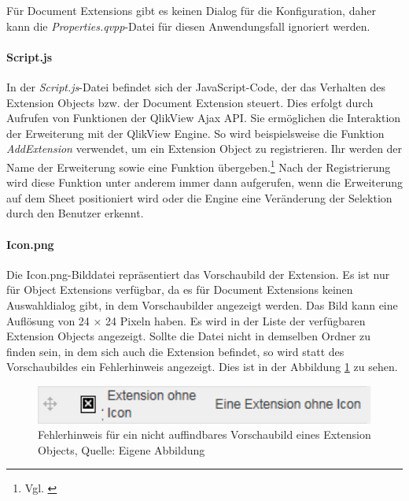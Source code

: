 Für Document Extensions gibt es keinen Dialog für die Konfiguration, daher kann die \textit{Properties.qvpp}-Datei für diesen Anwendungs\-fall ignoriert werden.

\paragraph{Script.js}

In der \textit{Script.js}-Datei befindet sich der JavaScript-Code, der das Verhalten des Extension Objects bzw. der Document Extension steuert. Dies erfolgt durch Aufrufen von Funktionen der QlikView Ajax API. Sie ermöglichen die Interaktion der Erweiterung mit der QlikView Engine. So wird beispielsweise die Funktion \textit{AddExtension} verwendet, um ein Extension Object zu registrieren. Ihr werden der Name der Erweiterung sowie eine Funktion übergeben.\footnote{Vgl. \cite{QlikViewAjaxJavaScriptLibraryAddExtension}} Nach der Registrierung wird diese Funktion unter anderem immer dann aufgerufen, wenn die Erweiterung auf dem Sheet positioniert wird oder die Engine eine Veränderung der Selektion durch den Benutzer erkennt.




\newpage
\paragraph{Icon.png}

Die Icon.png-Bild\-datei repräsentiert das Vorschaubild der Extension. Es ist nur für Object Extensions verfügbar, da es für Document Extensions keinen Auswahldialog gibt, in dem Vorschaubilder angezeigt werden. Das Bild kann eine Auflösung von 24 × 24 Pixeln haben. Es wird in der Liste der verfügbaren Extension Objects angezeigt. Sollte die Datei nicht in demselben Ordner zu finden sein, in dem sich auch die Extension befindet, so wird statt des Vorschau\-bildes ein Fehler\-hinweis angezeigt. Dies ist in der Abbildung \ref{fig:OhneIcon} zu sehen.

\begin{figure}[htbp]
	\centering
		\includegraphics[width=1.00\textwidth]{img/OhneIcon/OhneIcon.png}
	\caption[Fehlerhinweis für ein nicht auffindbares Vorschaubild eines Extension Objects]{Fehlerhinweis für ein nicht auffindbares Vorschaubild eines Extension Objects, Quelle: Eigene Abbildung}
	\label{fig:OhneIcon}
\end{figure}


